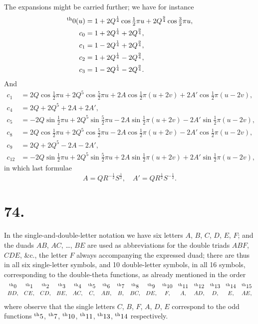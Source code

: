 \documentclass[11pt,a4paper]{book}
\providecommand{\uth}{\textsuperscript{th}}
\begin{document}
The expansions might be carried further; we have for instance
\begin{align*}
\uth{0}(u) &= 1 + 2Q^{\frac{1}{4}}\cos\tfrac{1}{2}\pi u + 2Q^{\frac{9}{4}}\cos\tfrac{3}{2}\pi u, \\
c_0 &= 1 + 2Q^{\frac{1}{4}} + 2Q^{\frac{9}{4}}, \\
c_1 &= 1 - 2Q^{\frac{1}{4}} + 2Q^{\frac{9}{4}}, \\
c_2 &= 1 + 2Q^{\frac{1}{4}} - 2Q^{\frac{9}{4}}, \\
c_3 &= 1 - 2Q^{\frac{1}{4}} - 2Q^{\frac{9}{4}}.
\end{align*}
And
\begin{align*}
c_1 &= 2Q\cos\tfrac{1}{2}\pi u + 2Q^5\cos\tfrac{5}{2}\pi u + 2A\cos\tfrac{1}{2}\pi(u+2v) + 2A'\cos\tfrac{1}{2}\pi(u-2v), \\
c_4 &= 2Q + 2Q^5 + 2A + 2A', \\
c_5 &= -2Q\sin\tfrac{1}{2}\pi u + 2Q^5\sin\tfrac{5}{2}\pi u - 2A\sin\tfrac{1}{2}\pi(u+2v) - 2A'\sin\tfrac{1}{2}\pi(u-2v), \\
c_8 &= 2Q\cos\tfrac{1}{2}\pi u + 2Q^5\cos\tfrac{5}{2}\pi u - 2A\cos\tfrac{1}{2}\pi(u+2v) - 2A'\cos\tfrac{1}{2}\pi(u-2v), \\
c_9 &= 2Q + 2Q^5 - 2A - 2A', \\
c_{12} &= -2Q\sin\tfrac{1}{2}\pi u + 2Q^5\sin\tfrac{5}{2}\pi u + 2A\sin\tfrac{1}{2}\pi(u+2v) + 2A'\sin\tfrac{1}{2}\pi(u-2v),
\end{align*}
in which last formulae
\[
A = QR^{-\frac{1}{2}}S^{\frac{1}{2}}, \quad A' = QR^{\frac{1}{2}}S^{-\frac{1}{2}}.
\]

\section*{74.}
\label{sec:74}

In the single-and-double-letter notation we have six letters $A$, $B$, $C$, $D$, $E$, $F$; and the duads $AB$, $AC$, \ldots, $BE$ are used as abbreviations for the double triads $ABF$, $CDE$, \&c., the letter $F$ always accompanying the expressed duad; there are thus in all six single-letter symbols, and 10 double-letter symbols, in all 16 symbols, corresponding to the double-theta functions, as already mentioned in the order
\[
\begin{array}{cccccccccccccccc}
\uth{0} & \uth{1} & \uth{2} & \uth{3} & \uth{4} & \uth{5} & \uth{6} & \uth{7} & \uth{8} & \uth{9} & \uth{10} & \uth{11} & \uth{12} & \uth{13} & \uth{14} & \uth{15} \\
BD, & CE, & CD, & BE, & AC, & C, & AB, & B, & BC, & DE, & F, & A, & AD, & D, & E, & AE,
\end{array}
\]
where observe that the single letters $C$, $B$, $F$, $A$, $D$, $E$ correspond to the odd functions $\uth{5}$, $\uth{7}$, $\uth{10}$, $\uth{11}$, $\uth{13}$, $\uth{14}$ respectively.
\end{document}
